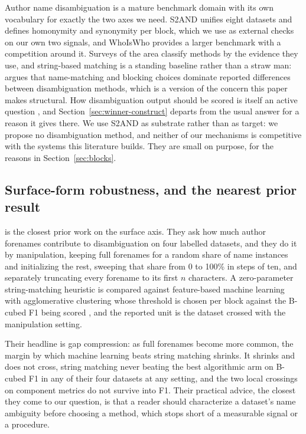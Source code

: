 \documentclass[11pt]{article}
\begin{document}
Author name disambiguation is a mature benchmark domain with its own
vocabulary for exactly the two axes we need. S2AND \citep{s2and2021} unifies
eight datasets and defines homonymity and synonymity per block, which we use
as external checks on our own two signals, and WhoIsWho \citep{whoiswho2023}
provides a larger benchmark with a competition around it. Surveys of the area
\citep{ferreira2012} classify methods by the evidence they use, and
string-based matching is a standing baseline rather than a straw man:
\citet{backes2018} argues that name-matching and blocking choices dominate
reported differences between disambiguation methods, which is a version of the
concern this paper makes structural. How disambiguation output should be
scored is itself an active question \citep{kim2019}, and
Section~\ref{sec:winner-construct} departs from the usual answer for a reason
it gives there. We use S2AND as substrate rather than as target: we propose no
disambiguation method, and neither of our mechanisms is competitive with the
systems this literature builds. They are small on purpose, for the reasons in
Section~\ref{sec:blocks}.

\subsection{Surface-form robustness, and the nearest prior result}
\label{sec:kimkim}

\citet{kimkim2020} is the closest prior work on the surface axis. They ask how
much author forenames contribute to disambiguation on four labelled datasets,
and they do it by manipulation, keeping full forenames for a random share of
name instances and initializing the rest, sweeping that share from 0 to 100\%
in steps of ten, and separately truncating every forename to its first $n$
characters. A zero-parameter string-matching heuristic is compared against
feature-based machine learning with agglomerative clustering whose threshold
is chosen per block against the B-cubed F1 being scored \citep{amigo2009}, and
the reported unit is the dataset crossed with the manipulation setting.

Their headline is gap compression: as full forenames become more common, the
margin by which machine learning beats string matching shrinks. It shrinks and
does not cross, string matching never beating the best algorithmic arm on
B-cubed F1 in any of their four datasets at any setting, and the two local
crossings on component metrics do not survive into F1. Their practical advice,
the closest they come to our question, is that a reader should characterize a
dataset's name ambiguity before choosing a method, which stops short of a
measurable signal or a procedure.
\end{document}

